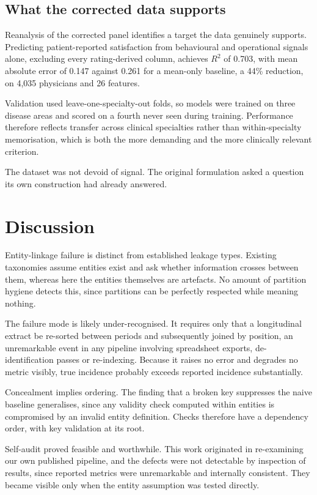 \documentclass[preprint,12pt]{elsarticle}
\begin{document}
\subsection{What the corrected data supports}

Reanalysis of the corrected panel identifies a target the data genuinely
supports. Predicting patient-reported satisfaction from behavioural and
operational signals alone, excluding every rating-derived column, achieves $R^2$
of 0.703, with mean absolute error of 0.147 against 0.261 for a mean-only
baseline, a 44\% reduction, on 4{,}035 physicians and 26 features.

Validation used leave-one-specialty-out folds, so models were trained on three
disease areas and scored on a fourth never seen during training. Performance
therefore reflects transfer across clinical specialties rather than
within-specialty memorisation, which is both the more demanding and the more
clinically relevant criterion.

The dataset was not devoid of signal. The original formulation asked a question
its own construction had already answered.

\section{Discussion}

Entity-linkage failure is distinct from established leakage types. Existing
taxonomies assume entities exist and ask whether information crosses between
them, whereas here the entities themselves are artefacts. No amount of partition
hygiene detects this, since partitions can be perfectly respected while meaning
nothing.

The failure mode is likely under-recognised. It requires only that a
longitudinal extract be re-sorted between periods and subsequently joined by
position, an unremarkable event in any pipeline involving spreadsheet exports,
de-identification passes or re-indexing. Because it raises no error and degrades
no metric visibly, true incidence probably exceeds reported incidence
substantially.

Concealment implies ordering. The finding that a broken key suppresses the naive
baseline generalises, since any validity check computed within entities is
compromised by an invalid entity definition. Checks therefore have a dependency
order, with key validation at its root.

Self-audit proved feasible and worthwhile. This work originated in re-examining
our own published pipeline, and the defects were not detectable by inspection of
results, since reported metrics were unremarkable and internally consistent.
They became visible only when the entity assumption was tested directly.
\end{document}
